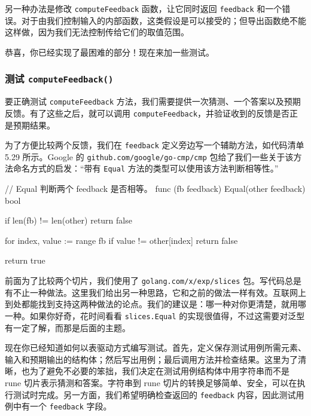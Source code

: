 另一种办法是修改 \texttt{computeFeedback} 函数，让它同时返回 \texttt{feedback} 和一个错误。对于由我们控制输入的内部函数，这类假设是可以接受的；但导出函数绝不能这样做，因为我们无法控制传给它们的取值范围。

恭喜，你已经实现了最困难的部分！现在来加一些测试。

\subsubsection*{测试 \texttt{computeFeedback()}}

要正确测试 \texttt{computeFeedback} 方法，我们需要提供一次猜测、一个答案以及预期反馈。有了这些之后，就可以调用 \texttt{computeFeedback}，并验证收到的反馈是否正是预期结果。

为了方便比较两个反馈，我们在 \texttt{feedback} 定义旁边写一个辅助方法，如代码清单 5.29 所示。Google 的 \texttt{github.com/google/go-cmp/cmp} 包给了我们一些关于该方法命名方式的启发：“带有 \texttt{Equal} 方法的类型可以使用该方法判断相等性。”

\begin{gocode}[title={代码清单 5.29 hint.go：\texttt{Equal()} 辅助方法}]
// Equal 判断两个 feedback 是否相等。
func (fb feedback) Equal(other feedback) bool {
    if len(fb) != len(other) {
        return false
    }

    for index, value := range fb {
        if value != other[index] {
            return false
        }
    }

    return true
}
\end{gocode}

前面为了比较两个切片，我们使用了 \texttt{golang.com/x/exp/slices} 包。写代码总是有不止一种做法。这里我们给出另一种思路，它和之前的做法一样有效。互联网上到处都能找到支持这两种做法的论点。我们的建议是：哪一种对你更清楚，就用哪一种。如果你好奇，花时间看看 \texttt{slices.Equal} 的实现很值得，不过这需要对泛型有一定了解，而那是后面的主题。

现在你已经知道如何以表驱动方式编写测试。首先，定义保存测试用例所需元素、输入和预期输出的结构体；然后写出用例；最后调用方法并检查结果。这里为了清晰，也为了避免不必要的笨拙，我们决定在测试用例结构体中用字符串而不是 rune 切片表示猜测和答案。字符串到 rune 切片的转换足够简单、安全，可以在执行测试时完成。另一方面，我们希望明确检查返回的 \texttt{feedback} 内容，因此测试用例中有一个 \texttt{feedback} 字段。

